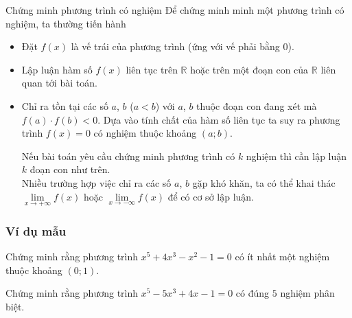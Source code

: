 
\begin{dang}{Chứng minh phương trình có nghiệm}
		Để chứng minh minh một phương trình có nghiệm, ta thường tiến hành
	\begin{itemize}
		\item Đặt $f(x)$ là vế trái của phương trình (ứng với vế phải bằng $0$).
		\item Lập luận hàm số $f(x)$ liên tục trên $\mathbb{R}$ hoặc trên một đoạn con của $\mathbb{R}$ liên quan tới bài toán.
		\item Chỉ ra tồn tại các số $a$, $b$ ($a<b$) với $a$, $b$ thuộc đoạn con đang xét mà $f(a)\cdot f(b)<0$. Dựa vào tính chất của hàm số liên tục ta suy ra phương trình $f(x)=0$ có nghiệm thuộc khoảng $(a;b)$.		
		\begin{note}
			Nếu bài toán yêu cầu chứng minh phương trình có $k$ nghiệm thì cần lập luận $k$ đoạn con như trên.\\
			Nhiều trường hợp việc chỉ ra các số $a$, $b$ gặp khó khăn, ta có thể khai thác $\lim \limits _{x\to +\infty}f(x)$ hoặc $\lim \limits _{x\to -\infty}f(x)$ để có cơ sở lập luận. 
		\end{note}
	\end{itemize}
\end{dang}
\subsubsection{Ví dụ mẫu}
\begin{vd}[NB]%
Chứng minh rằng phương trình $x^5+4x^3-x^2-1=0$ có ít nhất một nghiệm thuộc khoảng $(0;1)$.
\end{vd}
\begin{vd}[TH]%
Chứng minh rằng phương trình $x^5-5x^3+4x-1=0$ có đúng $5$ nghiệm phân biệt.
\end{vd}

